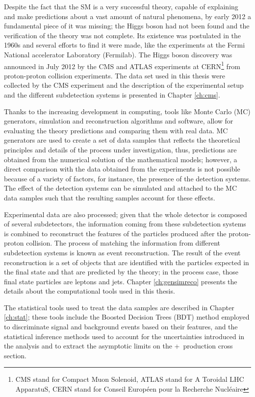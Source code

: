 Despite the fact that the SM is a very successful theory, capable of explaining and make predictions about a vast amount of natural phenomena, by early 2012 a fundamental piece of it was missing; the Higgs boson had not been found and the verification of the theory was not complete. Its existence was postulated in the 1960s and several efforts to find it were made, like the experiments at the Fermi National accelerator Laboratory (Fermilab). The Higgs boson discovery was announced in July 2012 by the CMS and ATLAS experiments at CERN\footnote{CMS stand for Compact Muon Solenoid, ATLAS stand for A Toroidal LHC ApparatuS, CERN stand for Conseil Europ\'een pour la Recherche Nucl\'eaire} from proton-proton collision experiments. The data set used in this thesis were collected by the CMS experiment and the description of the experimental setup and the different subdetection systems is presented in Chapter \ref{ch:cms}.

Thanks to the increasing development in computing, tools like Monte Carlo (MC) generators, simulation and reconstruction algorithms and software, allow for evaluating the theory predictions and comparing them with real data. MC generators are used to create a set of data samples that reflects the theoretical principles and details of the process under investigation, thus, predictions are obtained from the numerical solution of the mathematical models; however, a direct comparison with the data obtained from the experiments is not possible because of a variety of factors, for instance, the presence of the detection systems. The effect of the detection systems can be simulated and attached to the MC data samples such that the resulting samples account for these effects.

Experimental data are also processed; given that the whole detector is composed of several subdetectors, the information coming from these subdetection systems is combined to reconstruct the features of the particles produced after the proton-proton collision. The process of matching the information from different subdetection systems is known as event reconstruction. The result of the event reconstruction is a set of objects that are identified with the particles expected in the final state and that are predicted by the theory; in the \tH process case, those final state particles are leptons and jets. Chapter \ref{ch:gensimreco} presents the details about the computational tools used in this thesis.  

The statistical tools used to treat the data samples are described in Chapter \ref{ch:stat}; these tools include the Boosted Decision Trees (BDT) method employed to discriminate signal and background events based on their features, and the statistical inference methods used to account for the uncertainties introduced in the analysis and to extract the asymptotic limits on the \tH+\ttH\ production cross section. 

